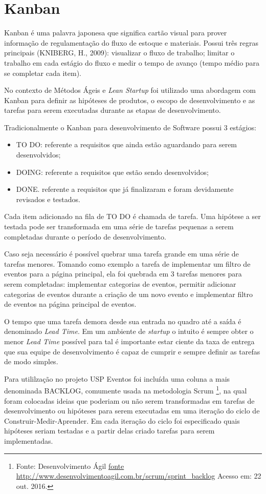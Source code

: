 \section{Kanban}
\par Kanban é uma palavra japonesa que significa cartão visual para prover informação de regulamentação do fluxo de estoque e materiais. Possui três regras principais (KNIBERG, H., 2009): visualizar o fluxo de trabalho; limitar o trabalho em cada estágio do fluxo e medir o tempo de avanço (tempo médio para se completar cada item).    \citep{francisco:14}
\par No contexto de Métodos Ágeis e \emph{Lean Startup} foi utilizado uma abordagem com Kanban para definir as hipóteses de produtos, o escopo de desenvolvimento e as tarefas para serem executadas durante as etapas de desenvolvimento.
\par Tradicionalmente o Kanban para desenvolvimento de Software possui 3 estágios: \citep{francisco:14}
\begin{itemize}
        \item TO DO: referente a requisitos que ainda estão aguardando para serem
desenvolvidos;
        \item DOING: referente a requisitos que estão sendo desenvolvidos;
        \item DONE. referente a requisitos que já finalizaram e foram devidamente
revisados e testados.
\end{itemize}
\par Cada item adicionado na fila de TO DO é chamada de tarefa. Uma hipótese a ser testada pode ser transformada em uma série de tarefas pequenas a serem completadas durante o período de desenvolvimento.
\par Caso seja necessário é possível quebrar uma tarefa grande em uma série de tarefas menores. Tomando como exemplo a tarefa de implementar um filtro de eventos para a página principal, ela foi quebrada em 3 tarefas menores para serem completadas: implementar categorias de eventos, permitir adicionar categorias de eventos durante a criação de um novo evento e implementar filtro de eventos na página principal de eventos.
\par O tempo que uma tarefa demora desde sua entrada no quadro até a saída é denominado \emph{Lead Time}. Em um ambiente de \emph{startup} o intuito é sempre obter o menor \emph{Lead Time} possível para tal é importante estar ciente da taxa de entrega que sua equipe de desenvolvimento é capaz de cumprir e sempre definir as tarefas de modo simples.
\par Para utililzação no projeto USP Eventos foi incluída uma coluna a mais denominada BACKLOG, comumente usada na metodologia Scrum \footnote{Fonte: Desenvolvimento Ágil \url{fonte http://www.desenvolvimentoagil.com.br/scrum/sprint_backlog} Acesso em: 22 out. 2016.}, na qual foram colocadas ideias que poderiam ou não serem transformadas em tarefas de desenvolvimento ou hipóteses para serem executadas em uma iteração do ciclo de Construir-Medir-Aprender. Em cada iteração do ciclo foi especificado quais hipóteses seriam testadas e a partir delas criado tarefas para serem implementadas.

